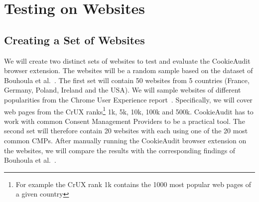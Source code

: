 \chapter{Testing on Websites}

\section{Creating a Set of Websites}

We will create two distinct sets of websites to test and evaluate the CookieAudit browser extension. 
The websites will be a random sample based on the dataset of Bouhoula et al.~\cite{bouhoula2023automated}. 
The first set will contain 50 websites from 5 countries (France, Germany, Poland, Ireland and the USA).
We will sample websites of different popularities from the Chrome User Experience report~\cite{GoogleCrux}.
Specifically, we will cover web pages from the CrUX ranks\footnote{For example the CrUX rank 1k contains the 1000 most popular web pages of a given country} 1k, 5k, 10k, 100k and 500k.
CookieAudit has to work with common Consent Management Providers to be a practical tool.
The second set will therefore contain 20 websites with each using one of the 20 most common CMPs. 
After manually running the CookieAudit browser extension on the websites, we will compare the results with the corresponding findings of Bouhoula et al.~\cite{bouhoula2023automated}.